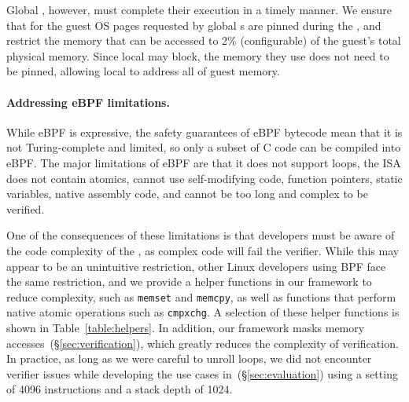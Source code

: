 \documentclass[11pt]{article}
\begin{document}
Global , however, must complete their execution in a timely manner. 
We ensure that for the guest OS pages requested by global \hypercallback{}s are 
pinned during the \hypercallback, and restrict the memory that can be accessed 
to 2\%  (configurable) of the guest's total physical memory.
Since local  may block, the memory
 they use does not need to be pinned, allowing local 
  to address all of guest memory.


\paragraph{Addressing eBPF limitations.} While eBPF is 
expressive, the safety guarantees of eBPF bytecode mean that it is not
 Turing-complete and limited, so only a subset of C 
 code can be compiled into eBPF. The major limitations of eBPF are 
 that it does not support loops, the ISA does not contain atomics,
  cannot use self-modifying code, function pointers, static variables, 
  native assembly code, and cannot be too long and complex to be verified.

One of the consequences of these limitations is that \hypercallback{} 
developers must be aware of the code complexity of the \hypercallback, 
as complex code will fail the verifier. While this may appear to be an 
unintuitive restriction, other Linux developers using BPF face the same 
restriction, and we provide a helper functions in our framework 
to reduce complexity, such as \texttt{memset} and \texttt{memcpy}, as well as
functions that perform native atomic operations such as \texttt{cmpxchg}. 
A selection of these helper functions is shown in Table~\ref{table:helpers}.
In addition, our framework masks memory accesses~(\S\ref{sec:verification}), 
which greatly reduces the complexity of verification. In practice, as
long as we were careful to unroll loops, we did not encounter verifier 
issues while developing the use cases in~(\S\ref{sec:evaluation}) using 
a setting of 4096 instructions and a stack depth of 1024.

\end{document}
